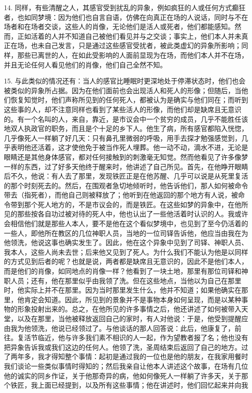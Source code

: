 14. 同样，有些清醒之人，其感官受到扰乱的异象，例如疯狂的人或任何方式癫狂者，也如同梦境：因为他们也自言自语，仿佛在向真正在场的人说话，同时与不在场者和在场者交谈，这些人的肖像，无论他们是活人或死者，他们都能感知。然而，正如活着的人并不知道自己被他们看见并与之交谈；事实上，他们本人并未真正在场，也未自己发言，只是通过这些感官受扰者，被此类虚幻的异象所影响；同样，那些已离世的人，在如此受影响的人面前显现为在场，而他们本人并不在场，并且无论任何人看见他们的肖像，他们自己全然不知。\par

15. 与此类似的情况还有：当人的感官比睡眠时更深地处于停滞状态时，他们也会被类似的异象所占据。因为在他们面前也会出现活人和死人的形像；但随后，当他们恢复知觉时，他们声称所见到的任何死人，都被认为是确实与他们同在；而听到这些事的人，却不注意同样也看到了某些活人的形像，而他们却是缺席且无意识的。有一个名叫的人，来自，靠近，是市议会中一个贫穷的成员，几乎不能胜任该地双人执政官的职务，而且是个十足的乡下人。他生了病，所有感官都陷入恍惚，几乎像死人一样躺了好几天：只有鼻孔里微弱的呼吸，用手去探才勉强感觉到，几乎表明他还活着，这才使他免于被当作死人埋葬。他一动不动，滴水不进，无论是眼睛还是其他身体感官，都对任何接触到的刺激毫无知觉。然而他看见了许多像梦一样的东西，过了好多天他终于醒来时，他讲述了自己所见。首先，在他睁开眼睛后不久，他说：有人去了那里，发现铁匠正是在他苏醒、几乎可以说是从死里复活的那个时刻死去的。然后，在围观者急切地倾听时，他告诉他们，那人如何被命令带去（指死者），而他自己则被释放了；他听到在他返回的那个地方有人说，被命令带到那个死人地方的，不是市议会的，而是铁匠。在这些如梦的异象中，在他所见的那些按各自功过被对待的死人中，他也认出了一些他活着时认识的人。我或许会相信他们就是那些人本人，要不是他在这个看似梦境中，也见到了至今仍活着的一些人，即他所在教区的几位神职人员，当地的一位司铎告诉他，他应当由我在为他领洗，他说这事也确实发生了。因此，他在这个异象中见到了司铎、神职人员、我本人，这些人尚未去世；后来他又见到了死人。为什么我们不能认为他是以同样的方式见到后者的呢？也就是说，两者都是缺席且无意识的，因此不是他们本人，而是他们的肖像，如同地点的肖像一样？他看到了一块土地，那里有那位司铎和神职人员；还有，他在那里似乎由我领了洗。但在这些地点，当他以为自己在那里时，他实际上并不在那里。因为当时那里发生什么，他并不知道；如果他确实在那里，他肯定会知道。因此，所见到的景象并不是事物本身如何呈现，而是以某种事物的形象投射出来的。总之，在他所见的许多事情之后，他还讲述了如何被带入天堂，以及在那里，当他被释放返回自己的家时，有人对他说：于是，他受到提醒应由我为他领洗，他说已经领过了。与他谈话的那人回答说：此后，他康复了，前往。复活节临近，他与许多我们素不相识的人一起，作为望教者报了名；他也没有把异象告诉我或我们这边的任何人。他领了洗，圣周结束后返回了自己的地方。过了两年多，我才得知整个事情：起初是通过我的一位也是他的朋友，在我家用餐时我们谈论一些类似事情时得知的；然后我亲自让他本人讲述这个故事，在场有几位他的诚实的同乡作证，关于他那奇异的病，他如何像死人一样躺了许多天，关于那个铁匠，我上面已经提到，以及所有这些事情；他在讲述时，他们回忆起来并向我